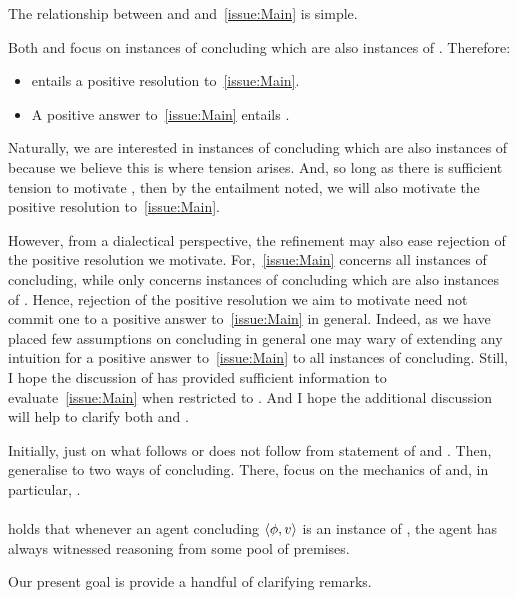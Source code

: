 \begin{note}
  The relationship between \ESU{} and \EAS{} and~\autoref{issue:Main} is simple.

  Both \EAS{} and \ESU{} focus on instances of concluding which are also instances of .
  Therefore:
  \begin{itemize}
  \item
    \EAS{} entails a positive resolution to~\autoref{issue:Main}.
  \item
    A positive answer to~\autoref{issue:Main} entails \ESU{}.
  \end{itemize}
  Naturally, we are interested in instances of concluding which are also instances of  because we believe this is where tension arises.
  And, so long as there is sufficient tension to motivate \EAS{}, then by the entailment noted, we will also motivate the positive resolution to~\autoref{issue:Main}.

  However, from a dialectical perspective, the refinement may also ease rejection of the positive resolution we motivate.
  For,~\autoref{issue:Main} concerns all instances of concluding, while \ESU{} only concerns instances of concluding which are also instances of \csVImp{}.
  Hence, rejection of the positive resolution we aim to motivate need not commit one to a positive answer to~\autoref{issue:Main} in general.
  Indeed, as we have placed few assumptions on concluding in general one may wary of extending any intuition for a positive answer to~\autoref{issue:Main} to all instances of concluding.
  Still, I hope the discussion of  has provided sufficient information to evaluate~\autoref{issue:Main} when restricted to .
  And I hope the additional discussion will help to clarify both \ESU{} and \EAS{}.

  {
    \color{red}
    Initially, just on what follows or does not follow from statement of \ESU{} and \EAS{}.
    Then, generalise to two ways of concluding.
    There, focus on the mechanics of \ESU{} and, in particular, \EAS{}.
  }
\end{note}

\paragraph*{\ESU{}}

\begin{note}
  \ESU{} holds that whenever an agent concluding \(\langle \phi, v \rangle\) is an instance of , the agent has always witnessed reasoning from some pool of premises.

  Our present goal is provide a handful of clarifying remarks.
\end{note}

